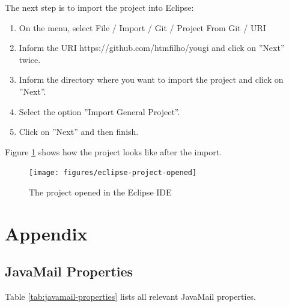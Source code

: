 \documentclass[envcountsame,envcountchap]{svmono}
\begin{document}
The next step is to import the project into Eclipse:
\begin{enumerate}
\item On the menu, select File / Import / Git / Project From Git / URI
\item Inform the URI https://github.com/htmfilho/yougi and click on ''Next'' twice.
\item Inform the directory where you want to import the project and click on ''Next''.
\item Select the option ''Import General Project''.
\item Click on ''Next'' and then finish.
\end{enumerate}

Figure \ref{fig:eclipse-project-opened} shows how the project looks like after the import. 

\begin{figure}
\centering
\texttt{[image: figures/eclipse-project-opened]}
\caption{The project opened in the Eclipse IDE}
\label{fig:eclipse-project-opened}
\end{figure}

\part*{Appendix}

\chapter*{JavaMail Properties}

Table \ref{tab:javamail-properties} lists all relevant JavaMail properties.
\end{document}

